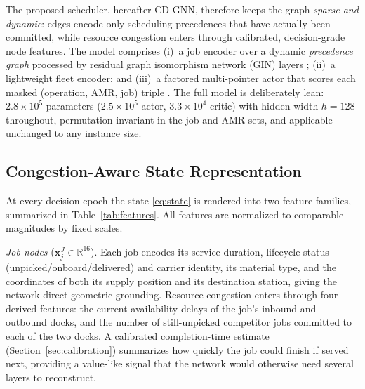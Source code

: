 The proposed scheduler, hereafter \textsc{CD-GNN}, therefore keeps the
graph \emph{sparse and dynamic}: edges encode only scheduling
precedences that have actually been committed, while resource
congestion enters through calibrated, decision-grade node features.
The model comprises (i)~a job encoder over a dynamic
\emph{precedence graph} processed by residual graph isomorphism
network (GIN) layers \cite{xu2019gin}; (ii)~a lightweight fleet
encoder; and (iii)~a factored multi-pointer actor that scores each
masked (operation, AMR, job) triple \cite{kool2019attention}. The full
model is deliberately lean: $2.8\times10^{5}$ parameters
($2.5\times10^{5}$ actor, $3.3\times10^{4}$ critic) with hidden width
$h=128$ throughout, permutation-invariant in the job and AMR sets, and
applicable unchanged to any instance size.


\subsection{Congestion-Aware State Representation}
\label{sec:features}

At every decision epoch the state \eqref{eq:state} is rendered into two
feature families, summarized in Table~\ref{tab:features}. All features
are normalized to comparable magnitudes by fixed scales.

\emph{Job nodes} ($\bm{x}^{J}_j\in\mathbb{R}^{16}$). Each job encodes
its service duration, lifecycle status (unpicked/onboard/delivered) and
carrier identity, its material type, and the coordinates of both its
supply position and its destination station, giving the network direct
geometric grounding. Resource congestion enters through four derived
features: the current availability delays of the job's inbound and
outbound docks, and the number of still-unpicked competitor jobs
committed to each of the two docks. A calibrated completion-time
estimate (Section~\ref{sec:calibration}) summarizes how quickly the job
could finish if served next, providing a value-like signal that the
network would otherwise need several layers to reconstruct.

